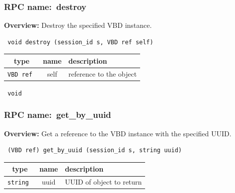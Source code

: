 \subsubsection{RPC name:~destroy}

{\bf Overview:} 
Destroy the specified VBD instance.

\begin{verbatim} void destroy (session_id s, VBD ref self)\end{verbatim}



 
\vspace{0.3cm}
\begin{tabular}{|c|c|p{7cm}|}
 \hline
{\bf type} & {\bf name} & {\bf description} \\ \hline
{\tt VBD ref } & self & reference to the object \\ \hline 

\end{tabular}

\vspace{0.3cm}

{\tt 
void
}



\vspace{0.3cm}
\vspace{0.3cm}
\vspace{0.3cm}
\subsubsection{RPC name:~get\_by\_uuid}

{\bf Overview:} 
Get a reference to the VBD instance with the specified UUID.

\begin{verbatim} (VBD ref) get_by_uuid (session_id s, string uuid)\end{verbatim}



 
\vspace{0.3cm}
\begin{tabular}{|c|c|p{7cm}|}
 \hline
{\bf type} & {\bf name} & {\bf description} \\ \hline
{\tt string } & uuid & UUID of object to return \\ \hline 

\end{tabular}

\vspace{0.3cm}

